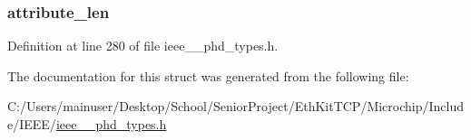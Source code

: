 \hypertarget{struct___attr_val_map_entry_a08b3ce23acfe6026cdab5b713cc71105}{}
\subsubsection[{attribute\+\_\+len}]{ attribute\+\_\+len}\label{struct___attr_val_map_entry_a08b3ce23acfe6026cdab5b713cc71105}


Definition at line 280 of file ieee\+\_\+\_\+phd\+\_\+types.\+h.



The documentation for this struct was generated from the following file\+:\begin{DoxyCompactItemize}
\item 
C\+:/\+Users/mainuser/\+Desktop/\+School/\+Senior\+Project/\+Eth\+Kit\+T\+C\+P/\+Microchip/\+Include/\+I\+E\+E\+E/\hyperlink{ieee__11073__phd__types_8h}{ieee\+\_\+\_\+phd\+\_\+types.\+h}\end{DoxyCompactItemize}
